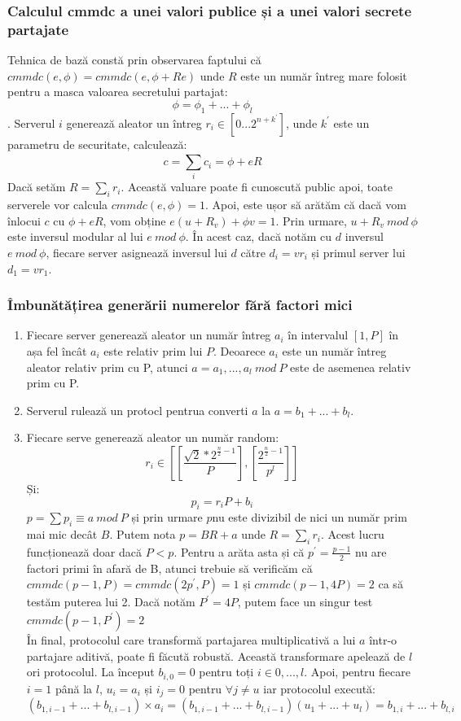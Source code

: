 \documentclass[12]{report}
\begin{document}
\subsubsection{Calculul cmmdc a unei valori publice și a unei valori secrete partajate}
Tehnica de bază constă prin observarea faptului că $cmmdc(e,\phi)=cmmdc(e,\phi + Re)$ unde $R$ este un număr întreg mare folosit pentru a masca valoarea secretului partajat:
$$\phi=\phi_1+...+\phi _l$$.
Serverul $i$ generează aleator un întreg $r_i \in [0 ... 2^{n+k^{'}}]$, unde $k^{'}$ este un parametru de securitate, calculează:
$$ c = \sum_{i}^{} c_i = \phi + eR$$
Dacă setăm $R=\sum_i r_i$. Această valuare poate fi cunoscută public apoi, toate serverele vor calcula $cmmdc(e,\phi)=1$. Apoi, este ușor să arătăm că dacă vom înlocui $c$ cu $\phi + eR$, vom obține $e(u + R_v) + \phi v = 1$. Prin urmare, $u + R_v \ mod \ \phi$ este inversul modular al lui $e \ mod \ \phi$. În acest caz, dacă notăm cu $d$ inversul $e \ mod \ \phi$, fiecare server asignează inversul lui $d$ către $d_i = vr_i$ și primul server lui $d_1= vr_1$.
\subsubsection{Îmbunătățirea generării numerelor fără factori mici}
\begin{enumerate}
\item Fiecare server generează aleator un număr întreg $a_i$ în intervalul $[1,P]$ în așa fel încât $a_i$ este relativ prim lui $P$. Deoarece $a_i$ este un număr întreg aleator relativ prim cu P, atunci $a=a_1,...,a_l \ mod \ P$ este de asemenea relativ prim cu P.

\item Serverul rulează un protocl pentrua converti $a$ la $a=b_1+...+b_l$.

\item Fiecare serve generează aleator un număr random:
$$r_i \in \left[  [ \frac{\sqrt{2}* 2^{\frac{n}{2} -1} }{P}   ], [\frac{2^{\frac{n}{2}-1}}{p^l}]      \right] $$
Și:
$$ p_i=r_i P + b_i$$
$p = \sum p_i \equiv a \ mod \ P$ și prin urmare $p$nu este divizibil de nici un număr prim mai mic decât $B$. Putem nota $p=BR +a$ unde $R=\sum_{i} r_i$. Acest lucru funcționează doar dacă $P<p$. Pentru a arăta asta și că $p^{'} = \frac{p-1}{2}$ nu are factori primi în afară de B, atunci trebuie să verificăm că $cmmdc(p-1,P)=cmmdc(2p^{'},P)=1$ și $cmmdc(p-1,4P)=2$ ca să testăm puterea lui 2. Dacă notăm $P^{'}=4P$, putem face un singur test $cmmdc(p-1,P^{'})=2$\\
În final, protocolul care transformă partajarea multiplicativă a lui $a$ într-o partajare aditivă, poate fi făcută robustă. Această transformare apelează de $l$ ori protocolul. La început $b_{i,0}=0$ pentru toți $i \in {0,...,l}$. Apoi, pentru fiecare $i=1$ până la $l$, $u_i=a_i$ și $i_j=0$ pentru $\forall j \neq u$ iar protocolul execută: 
$$(b_{1,i-1}+...+b_{l,i-1}) \times a_i = (b_{1,i-1}+...+b_{l,i-1})(u_1+...+u_l)=b_{1,i}+...+b_{l,i}$$
\end{enumerate}
\end{document}
